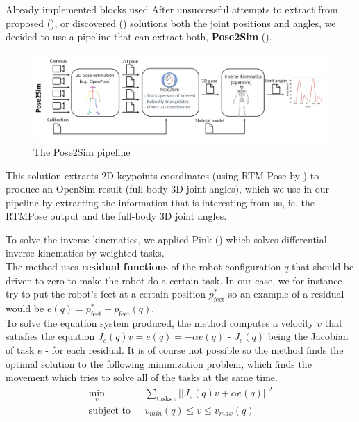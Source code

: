 \documentclass[final]{beamer}
\newlength{\colwidth}
\begin{document}
\begin{frame}[t]
\begin{columns}[t]
\begin{column}{\colwidth}
\begin{block}{Already implemented blocks used}
After unsuccessful attempts to extract from proposed (\cite{Li_2019}), or discovered (\cite{li2023niki}) solutions both the joint positions and angles, we decided to use a pipeline that can extract both, \textbf{Pose2Sim} (\cite{Pose2Sim}). 
 \begin{figure}
      \centering
      \includegraphics[width = 0.99 \columnwidth]{img/pose2sim_pipeline.png}
      \caption{The Pose2Sim pipeline}
    \end{figure}
\end{block}
This solution extracts 2D keypoints coordinates (using RTM Pose by \cite{RTMPose}) to produce an OpenSim result (full-body 3D joint angles), which we use in our pipeline by extracting the information that is interesting from us, ie. the RTMPose output and the full-body 3D joint angles. 

To solve the inverse kinematics, we applied Pink (\cite{pink2024}) which solves differential inverse kinematics by weighted tasks. \\ 
The method uses \textbf{residual functions} of the robot configuration $q$ that should be driven to zero to make the robot do a certain task. In our case, we for instance try to put the robot's feet at a certain position $p_{\text{feet}}^*$ so an example of a residual would be $e(q) = p_{\text{feet}}^* - p_{\text{feet}}(q)$. \\
To solve the equation system produced, the method computes a velocity $v$ that satisfies the equation $J_e(q)v = \dot{e}(q) = -\alpha e(q)$ - $J_e(q)$ being the Jacobian of task $e$ - for each residual. It is of course not possible so the method finds the optimal solution to the following minimization problem, which finds the movement which tries to solve all of the tasks at the same time.
$$
\begin{aligned}
\min_v \ \ &\sum_{\text{tasks} \ e} ||J_e(q)v + \alpha e(q)||^2 \\
\text{subject to} \ \ \ &v_{min}(q) \leq v \leq v_{max}(q)
\end{aligned}
$$


\end{column}
\end{columns}
\end{frame}
\end{document}
